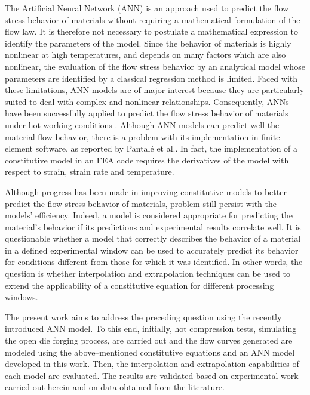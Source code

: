\documentclass[twoside,english,1p,final,sort&compress]{elsarticle}
\makeatletter
\theoremstyle{plain}
\DeclareRobustCommand{\eal}{et al.\@\xspace}
\makeatother
\begin{document}
The Artificial Neural Network (ANN) is an approach used to predict the flow stress behavior of materials without requiring a mathematical formulation of the flow law.
It is therefore not necessary to postulate a mathematical expression to identify the parameters of the model.
Since the behavior of materials is highly nonlinear at high temperatures, and depends on many factors which are also nonlinear, the evaluation of the flow stress behavior by an analytical model whose parameters are identified by a classical regression method is limited.
Faced with these limitations, ANN models are of major interest because they are particularly suited to deal with complex and nonlinear relationships.
Consequently, ANNs have been successfully applied to predict the flow stress behavior of materials under hot working conditions \cite{Lin-2008-ANN, Lu-2011-ANN, Ashtiani-2016-CSP, Stoffel-2019-NNB}.
Although ANN models can predict well the material flow behavior, there is a problem with its implementation in finite element software, as reported by Pantalé \eal \cite{Pantale-2021, Pantale-2023}.
In fact, the implementation of a constitutive model in an FEA code requires the derivatives of the model with respect to strain, strain rate and temperature.

Although progress has been made in improving constitutive models to better predict the flow stress behavior of materials, problem still persist with the models' efficiency.
Indeed, a model is considered appropriate for predicting the material's behavior if its predictions and experimental results correlate well.
It is questionable whether a model that correctly describes the behavior of a material in a defined experimental window can be used to accurately predict its behavior for conditions different from those for which it was identified.
In other words, the question is whether interpolation and extrapolation techniques can be used to extend the applicability of a constitutive equation for different processing windows.

The present work aims to address the preceding question using the recently introduced ANN model.
To this end, initially, hot compression tests, simulating the open die forging process, are carried out and the flow curves generated are modeled using the above--mentioned constitutive equations and an ANN model developed in this work.
Then, the interpolation and extrapolation capabilities of each model are evaluated.
The results are validated based on experimental work carried out herein and on data obtained from the literature.
\end{document}
